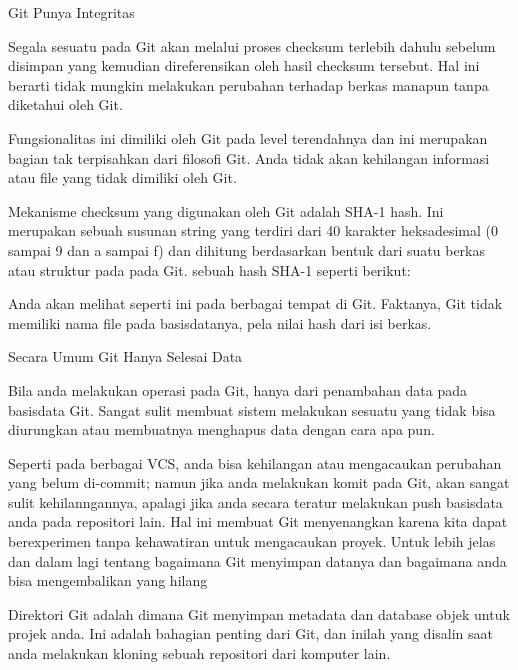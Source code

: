 \noindent 
Git Punya Integritas \par
\noindent 
Segala sesuatu pada Git akan melalui proses checksum terlebih dahulu sebelum disimpan yang kemudian direferensikan oleh hasil checksum tersebut. Hal ini berarti tidak mungkin melakukan perubahan terhadap berkas manapun tanpa diketahui oleh Git.  \par
\noindent 
Fungsionalitas ini dimiliki oleh Git pada level terendahnya dan ini merupakan bagian tak terpisahkan dari filosofi Git. Anda tidak akan kehilangan informasi atau file yang tidak dimiliki oleh Git. \par
 \vspace{\baselineskip}
\noindent 
 \hspace*{0.5in} Mekanisme checksum yang digunakan oleh Git adalah SHA-1 hash. Ini merupakan sebuah susunan string yang terdiri dari 40 karakter heksadesimal (0 sampai 9 dan a sampai f) dan dihitung berdasarkan bentuk dari suatu berkas atau struktur pada pada Git. sebuah hash SHA-1 seperti berikut: \par
\noindent 
Anda akan melihat seperti ini pada berbagai tempat di Git. Faktanya, Git tidak memiliki nama file pada basisdatanya, pela nilai hash dari isi berkas. \par
\noindent 
Secara Umum Git Hanya Selesai Data \par
 \vspace{\baselineskip}
\noindent 
Bila anda melakukan operasi pada Git, hanya dari penambahan data pada basisdata Git. Sangat sulit membuat sistem melakukan sesuatu yang tidak bisa diurungkan atau membuatnya menghapus data dengan cara apa pun.  \par
 \vspace{\baselineskip}
\noindent 
Seperti pada berbagai VCS, anda bisa kehilangan atau mengacaukan perubahan yang belum di-commit; namun jika anda melakukan komit pada Git, akan sangat sulit kehilanngannya, apalagi jika anda secara teratur melakukan push basisdata anda pada repositori lain. Hal ini membuat Git menyenangkan karena kita dapat berexperimen tanpa kehawatiran untuk mengacaukan proyek. Untuk lebih jelas dan dalam lagi tentang bagaimana Git menyimpan datanya dan bagaimana anda bisa mengembalikan yang hilang \par
 \vspace{\baselineskip}
\noindent 
Direktori Git adalah dimana Git menyimpan metadata dan database objek untuk projek anda. Ini adalah bahagian penting dari Git, dan inilah yang disalin saat anda melakukan kloning sebuah repositori dari komputer lain. \par
